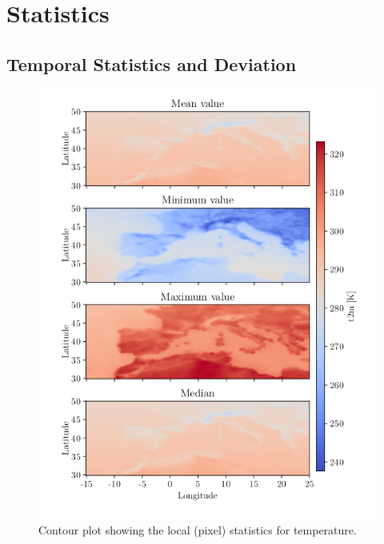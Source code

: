 \appendix
\chapter{Statistics} \label{ch:appendix_statistic}
\section{Temporal Statistics and Deviation} \label{sec:all_stats}
\begin{figure}[ht]
    \centering
    \includegraphics[scale=0.9]{python_figs/all_stat_variable_t2m.png}
    \caption{Contour plot showing the local (pixel) statistics for temperature.}
    \label{fig:all_stats_t2m}
\end{figure}
